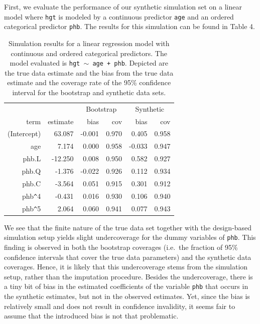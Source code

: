 \documentclass[psych,article,submit,moreauthors,pdftex]{mdpi}
\begin{document}
First, we evaluate the performance of our synthetic simulation set on a
linear model where \texttt{hgt} is modeled by a continuous predictor
\texttt{age} and an ordered categorical predictor \texttt{phb}. The
results for this simulation can be found in Table 4.

\begin{table}[ht]
\caption{Simulation results for a linear regression model with continuous and ordered categorical predictors. The model evaluated is \texttt{hgt $\sim$ age + phb}. Depicted are the true data estimate and the bias from the true data estimate and the coverage rate of the 95\% confidence interval for the bootstrap and synthetic data sets.}
\centering
\begin{tabular}{rrrrrr}
  \hline
  & & \multicolumn{2}{c}{Bootstrap} & \multicolumn{2}{c}{Synthetic}\\
 term & estimate & bias & cov & bias & cov \\ 
  \hline
(Intercept) & 63.087 & -0.001 & 0.970 & 0.405 & 0.958 \\ 
  age & 7.174 & 0.000 & 0.958 & -0.033 & 0.947 \\ 
  phb.L & -12.250 & 0.008 & 0.950 & 0.582 & 0.927 \\ 
  phb.Q & -1.376 & -0.022 & 0.926 & 0.112 & 0.934 \\ 
  phb.C & -3.564 & 0.051 & 0.915 & 0.301 & 0.912 \\ 
  phb\verb|^|4 & -0.431 & 0.016 & 0.930 & 0.106 & 0.940 \\ 
  phb\verb|^|5 & 2.064 & 0.060 & 0.941 & 0.077 & 0.943 \\ 
   \hline
\end{tabular}
\end{table}

We see that the finite nature of the true data set together with the
design-based simulation setup yields slight undercoverage for the dummy
variables of \texttt{phb}. This finding is observed in both the
bootstrap coverages (i.e.~the fraction of 95\% confidence intervals that
cover the true data parameters) and the synthetic data coverages. Hence,
it is likely that this undercoverage stems from the simulation setup,
rather than the imputation procedure. Besides the undercoverage, there
is a tiny bit of bias in the estimated coefficients of the variable
\texttt{phb} that occurs in the synthetic estimates, but not in the
observed estimates. Yet, since the bias is relatively small and does not
result in confidence invalidity, it seems fair to assume that the
introduced bias is not that problematic.
\end{document}
